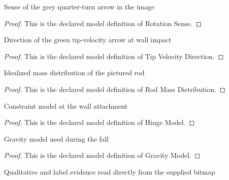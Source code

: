 \begin{definition}
  \label{def:physics:phyx-mini-0699:phyxminiproblems-problemphyxmini0699-rotationsense}
  Sense of the grey quarter-turn arrow in the image
\end{definition}
\begin{proof}
  This is the declared model definition of Rotation Sense.
\end{proof}
\begin{definition}
  \label{def:physics:phyx-mini-0699:phyxminiproblems-problemphyxmini0699-tipvelocitydirection}
  Direction of the green tip-velocity arrow at wall impact
\end{definition}
\begin{proof}
  This is the declared model definition of Tip Velocity Direction.
\end{proof}
\begin{definition}
  \label{def:physics:phyx-mini-0699:phyxminiproblems-problemphyxmini0699-rodmassdistribution}
  Idealized mass distribution of the pictured rod
\end{definition}
\begin{proof}
  This is the declared model definition of Rod Mass Distribution.
\end{proof}
\begin{definition}
  \label{def:physics:phyx-mini-0699:phyxminiproblems-problemphyxmini0699-hingemodel}
  Constraint model at the wall attachment
\end{definition}
\begin{proof}
  This is the declared model definition of Hinge Model.
\end{proof}
\begin{definition}
  \label{def:physics:phyx-mini-0699:phyxminiproblems-problemphyxmini0699-gravitymodel}
  Gravity model used during the fall
\end{definition}
\begin{proof}
  This is the declared model definition of Gravity Model.
\end{proof}
\begin{definition}
  \label{def:physics:phyx-mini-0699:phyxminiproblems-problemphyxmini0699-hingedrodfigure}
  Qualitative and label evidence read directly from the supplied bitmap
\end{definition}
